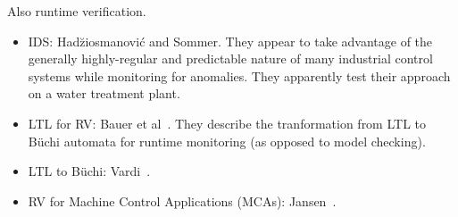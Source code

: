 Also runtime verification.

\begin{itemize}

\item IDS: Had\u ziosmanovi\'c and Sommer. They appear to take advantage of the
generally highly-regular and predictable nature of many industrial control
systems while monitoring for anomalies. They apparently test their approach on a
water treatment plant.


\item LTL for RV: Bauer et al~\cite{bauer:rv_ltl}. They describe the tranformation from LTL
to B\"uchi automata for runtime monitoring (as opposed to model checking).

\item LTL to B\"uchi: Vardi~\cite{vardi:ltl_at}.

\item RV for Machine Control Applications (MCAs): Jansen~\cite{jansen:master}.

\end{itemize}

